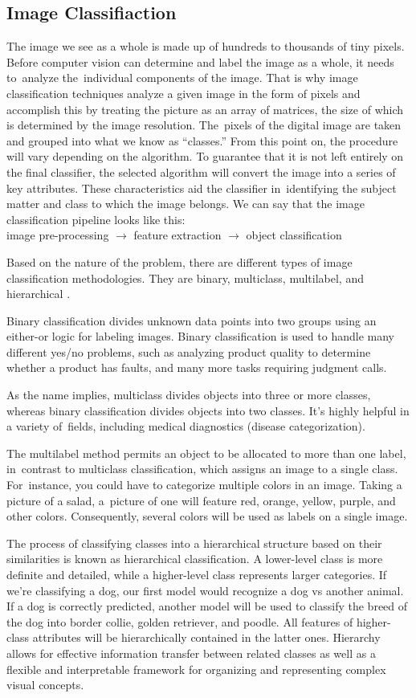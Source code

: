\subsection{Image Classifiaction}
The image we see as a whole is made up of hundreds to thousands of tiny pixels. Before computer vision can determine and label the image as a whole, it needs to~analyze the~individual components of the image. That is why image classification techniques analyze a given image in the form of pixels and accomplish this by treating the picture as an array of matrices, the size of which is determined by the image resolution. The~pixels of the digital image are taken and grouped into what we know as “classes.” From this point on, the procedure will vary depending on the algorithm. To guarantee that it is not left entirely on the final classifier, the selected algorithm will convert the image into a series of key attributes. These characteristics aid the classifier in~identifying the subject matter and class to which the image belongs.
We can say that the image classification pipeline looks like this:\\
image pre-processing $\to$ feature extraction $\to$ object classification


Based on the nature of the problem, there are different types of image classification methodologies. They are binary, multiclass, multilabel, and hierarchical \cite{CERRI201439}.

Binary classification divides unknown data points into two groups using an either-or logic for labeling images. Binary classification is used to handle many different yes/no problems, such as analyzing product quality to determine whether a product has faults, and many more tasks requiring judgment calls.

As the name implies, multiclass divides objects into three or more classes, whereas binary classification divides objects into two classes. It's highly helpful in a variety of~fields, including medical diagnostics (disease categorization).

The multilabel method permits an object to be allocated to more than one label, in~contrast to multiclass classification, which assigns an image to a single class. For~instance, you could have to categorize multiple colors in an image. Taking a picture of a salad, a~picture of one will feature red, orange, yellow, purple, and other colors. Consequently, several colors will be used as labels on a single image.

The process of classifying classes into a hierarchical structure based on their similarities is known as hierarchical classification. A lower-level class is more definite and detailed, while a higher-level class represents larger categories. If we're classifying a dog, our first model would recognize a dog vs another animal. If a dog is correctly predicted, another model will be used to classify the breed of the dog into border collie, golden retriever, and poodle. All features of higher-class attributes will be hierarchically contained in the latter ones. Hierarchy allows for effective information transfer between related classes as well as a flexible and interpretable framework for organizing and representing complex visual concepts.


